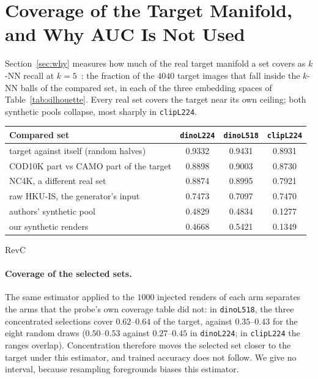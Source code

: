 \section{Coverage of the Target Manifold, and Why AUC Is Not Used}
\label{app:coverage}

Section~\ref{sec:why} measures how much of the real target manifold a set covers as $k$-NN recall
at $k = 5$~\citep{kynkaanniemi2019improved}: the fraction of the $4040$ target images that fall inside
the $k$-NN balls of the compared set, in each of the three embedding spaces of Table~\ref{tab:silhouette}.
Every real set covers the target near its own ceiling; both synthetic pools collapse, most sharply in
\texttt{clipL224}. 

\begin{center}\small
\begin{tabular}{lccc}
\toprule
Compared set & \texttt{dinoL224} & \texttt{dinoL518} & \texttt{clipL224} \\
\midrule
target against itself (random halves) & 0.9332 & 0.9431 & 0.8931 \\
COD10K part vs CAMO part of the target & 0.8898 & 0.9003 & 0.8730 \\
NC4K, a different real set & 0.8874 & 0.8995 & 0.7921 \\
raw HKU-IS, the generator's input & 0.7473 & 0.7097 & 0.7470 \\
authors' synthetic pool & 0.4829 & 0.4834 & 0.1277 \\
our synthetic renders & 0.4668 & 0.5421 & 0.1349 \\
\bottomrule
\end{tabular}
\end{center}

\begin{revblock}{RevC}
\paragraph{Coverage of the selected sets.} The same estimator applied to the $1000$ injected renders of each arm
separates the arms that the probe's own coverage table did not: in \texttt{dinoL518}, the three concentrated selections
cover $0.62$--$0.64$ of the target, against $0.35$--$0.43$ for the eight random draws ($0.50$--$0.53$ against
$0.27$--$0.45$ in \texttt{dinoL224}; in \texttt{clipL224} the ranges overlap). Concentration therefore moves the
selected set closer to the target under this estimator, and trained accuracy does not follow. We give no interval,
because resampling foregrounds biases this estimator.
\end{revblock}

